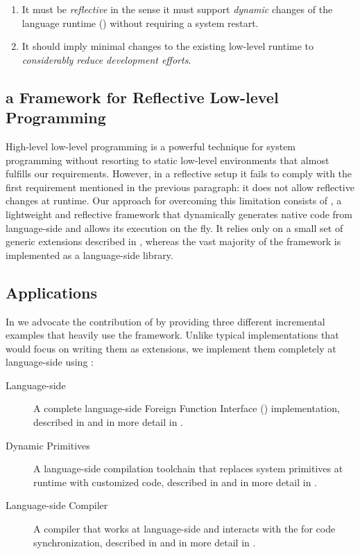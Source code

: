 \begin{enumerate}
	\item It must be \emph{reflective} in the sense it must support \emph{dynamic} changes of the language runtime (\VM) without requiring a system restart.
	\item It should imply minimal changes to the existing low-level runtime to \emph{considerably reduce development efforts}.
\end{enumerate}


\subsection{\B a Framework for Reflective Low-level Programming}

High-level low-level programming is a powerful technique for system programming without resorting to static low-level environments \cite{Fram09a,Wimm13a} that almost fulfills our requirements.
However, in a reflective setup it fails to comply with the first requirement mentioned in the previous paragraph: it does not allow reflective changes at runtime.
Our approach for overcoming this limitation consists of \B, a lightweight and reflective framework that dynamically generates native code from language-side and allows its execution on the fly.
It relies only on a small set of generic \VM extensions described in , whereas the vast majority of the framework is implemented as a language-side library.

\subsection{\B Applications}
In  we advocate the contribution of \B by providing three different incremental examples that heavily use the framework.
Unlike typical implementations that would focus on writing them as \VM extensions, we implement them completely at language-side using \B:

\begin{description}
	\item[Language-side \FFI] A complete language-side Foreign Function Interface (\FFI) implementation, described in  and in more detail in .
	\item[Dynamic Primitives] A language-side compilation toolchain that replaces system primitives at runtime with customized code, described in  and in more detail in . 
	\item[Language-side \JIT Compiler] A \JIT compiler that works at language-side and interacts with the \VM for code synchronization, described in  and in more detail in .
\end{description}

